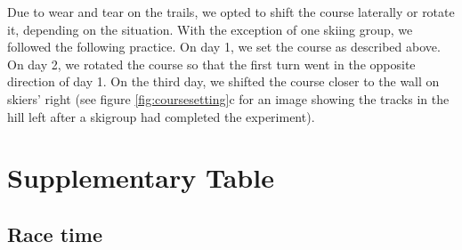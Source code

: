 \documentclass[pdflatex,sn-mathphys-num]{sn-jnl}%
\theoremstyle{thmstyleone}%
\theoremstyle{thmstyletwo}%
\theoremstyle{thmstylethree}%
\begin{document}
\begin{appendices}
Due to wear and tear on the trails, we opted to shift the course laterally or rotate it, depending on the situation. With the exception of one skiing group, we followed the following practice. On day 1, we set the course as described above. On day 2, we rotated the course so that the first turn went in the opposite direction of day 1. On the third day, we shifted the course closer to the wall on skiers' right (see figure \ref{fig:coursesetting}c for an image showing the tracks in the hill left after a skigroup had completed the experiment). 


\section{Supplementary Table}

\subsection{Race time}



\end{appendices}
\end{document}

